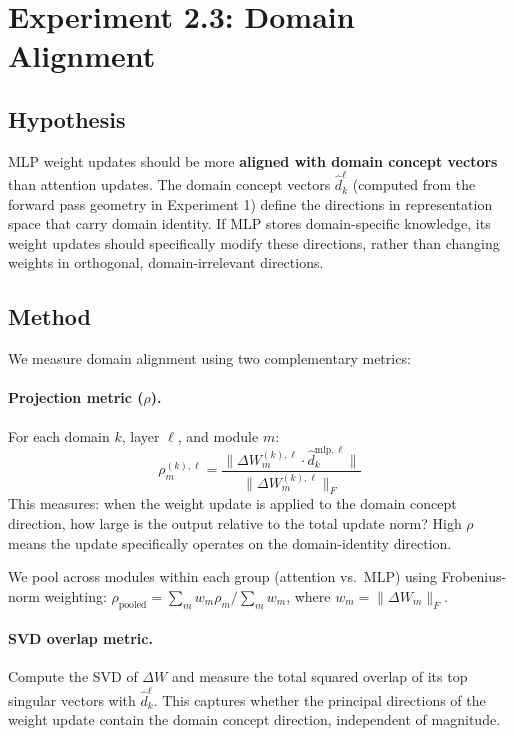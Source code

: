 \documentclass[11pt,a4paper]{article}
\begin{document}
\section{Experiment 2.3: Domain Alignment}
\label{sec:alignment}

\subsection{Hypothesis}
MLP weight updates should be more \textbf{aligned with domain concept vectors} than attention updates. The domain concept vectors $\hat{d}^{\ell}_k$ (computed from the forward pass geometry in Experiment 1) define the directions in representation space that carry domain identity. If MLP stores domain-specific knowledge, its weight updates should specifically modify these directions, rather than changing weights in orthogonal, domain-irrelevant directions.

\subsection{Method}
We measure domain alignment using two complementary metrics:

\paragraph{Projection metric ($\rho$).} For each domain $k$, layer $\ell$, and module $m$:
\[
\rho^{(k),\ell}_m = \frac{\|\Delta W^{(k),\ell}_m \cdot \hat{d}^{\text{mlp},\ell}_k\|}{\|\Delta W^{(k),\ell}_m\|_F}
\]
This measures: when the weight update is applied to the domain concept direction, how large is the output relative to the total update norm? High $\rho$ means the update specifically operates on the domain-identity direction.

We pool across modules within each group (attention vs.\ MLP) using Frobenius-norm weighting: $\rho_{\text{pooled}} = \sum_m w_m \rho_m / \sum_m w_m$, where $w_m = \|\Delta W_m\|_F$.

\paragraph{SVD overlap metric.} Compute the SVD of $\Delta W$ and measure the total squared overlap of its top singular vectors with $\hat{d}^{\ell}_k$. This captures whether the principal directions of the weight update contain the domain concept direction, independent of magnitude.
\end{document}
